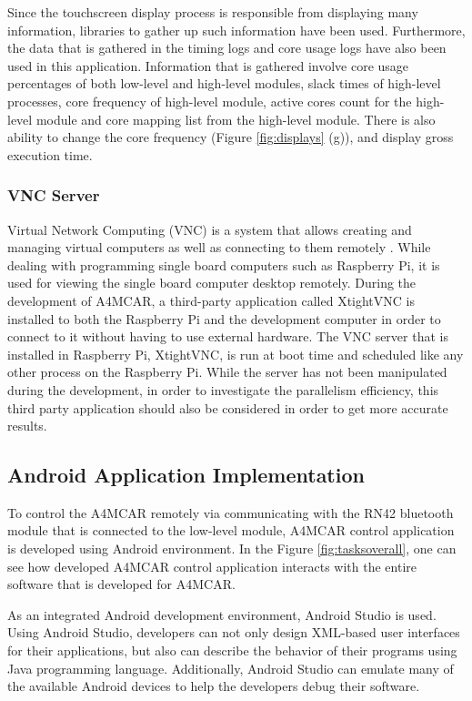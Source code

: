Since the touchscreen display process is responsible from displaying many information, libraries to gather up such information have been used. Furthermore, the data that is gathered in the timing logs and core usage logs have also been used in this application. Information that is gathered involve core usage percentages of both low-level and high-level modules, slack times of high-level processes, core frequency of high-level module, active cores count for the high-level module and core mapping list from the high-level module. There is also ability to change the core frequency (Figure \ref{fig:displays} (g)), and display gross execution time. 

\subsubsection{VNC Server}
Virtual Network Computing (VNC) is a system that allows creating and managing virtual computers as well as connecting to them remotely \cite{vncmagazine}. While dealing with programming single board computers such as Raspberry Pi, it is used for viewing the single board computer desktop remotely. During the development of A4MCAR, a third-party application called XtightVNC is installed to both the Raspberry Pi and the development computer in order to connect to it without having to use external hardware.  The VNC server that is installed in Raspberry Pi, XtightVNC, is run at boot time and scheduled like any other process on the Raspberry Pi. While the server has not been manipulated during the development, in order to investigate the parallelism efficiency, this third party application should also be considered in order to get more accurate results. 

\subsection{Android Application Implementation}
To control the A4MCAR remotely via communicating with the RN42 bluetooth module that is connected to the low-level module, A4MCAR control application is developed using Android \cite{androidwebsite} environment. In the Figure \ref{fig:tasksoverall}, one can see how developed A4MCAR control application interacts with the entire software that is developed for A4MCAR. 

As an integrated Android development environment, Android Studio \cite{androidstudio} is used. Using Android Studio, developers can not only design XML-based user interfaces for their applications, but also can describe the behavior of their programs using Java programming language. Additionally, Android Studio can emulate many of the available Android devices to help the developers debug their software. 

